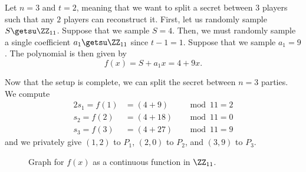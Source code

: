 \documentclass[parskip=half]{scrartcl}
\begin{document}
Let $n = 3$ and $t = 2$, meaning that we want to split a secret between $3$ players such that any $2$ players can reconstruct it.
First, let us randomly sample $S \getsu \ZZ_{11}$.
Suppose that we sample $S=4$.
Then, we must randomly sample a single coefficient $a_1 \getsu \ZZ_{11}$ since $t-1 = 1$.
Suppose that we sample $a_1 = 9$.
The polynomial is then given by
\[
  f(x) = S + a_1x = 4 + 9x.
\]

Now that the setup is complete, we can split the secret between $n=3$ parties.
We compute
\begin{alignat*}{2}
  s_1 = f(1) &= (4 + 9) &&\bmod{11} = 2\\
  s_2 = f(2) &= (4 + 18) &&\bmod{11} = 0\\
  s_3 = f(3) &= (4 + 27) &&\bmod{11} = 9
\end{alignat*}
and we privately give $(1, 2)$ to $P_1$, $(2, 0)$ to $P_2$, and $(3, 9)$ to $P_3$.

\begin{figure}[h!]
  \centering
  \caption{Graph for $f(x)$ as a continuous function in $\ZZ_{11}$.}
  \label{fig:graph}
\end{figure}
\end{document}
